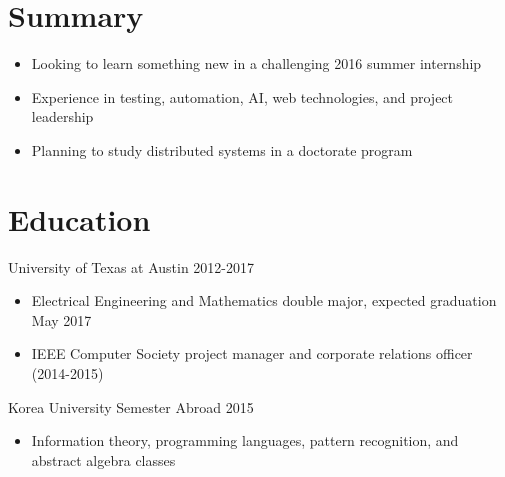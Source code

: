 \documentclass[line,margin]{res}
\begin{document}
    \address{10336 Kilmarnock Drive, Austin, TX 78726}
    \address{(512) 917-8236 |
    \href{mailto:jdong42@gmail.com}{jdong42@gmail.com}}

\begin{resume}

\vspace{-8pt}
\section{Summary}
\vspace{22pt}
    \begin{itemize} \itemsep -2pt %
    \item Looking to learn something new in a challenging 2016 summer internship
    \item Experience in testing, automation, AI, web technologies, and project leadership 
    \item Planning to study distributed systems in a doctorate program
    \end{itemize}

   
\vspace{-8pt}
\section{Education} 
\vspace{12pt}
University of Texas at Austin \hfill 2012-2017 \\
\vspace{-12pt}
    \begin{itemize} \itemsep -2pt %
    \item Electrical Engineering and Mathematics double major, expected graduation May 2017
    \item IEEE Computer Society project manager and corporate relations officer (2014-2015)
    \end{itemize}
 
\vspace{-6pt}
Korea University Semester Abroad \hfill 2015 \\
\vspace{-12pt}
    \begin{itemize} \itemsep -2pt %
    \item Information theory, programming languages, pattern recognition, and abstract algebra classes
    \end{itemize}
  


\end{resume}
\end{document}
